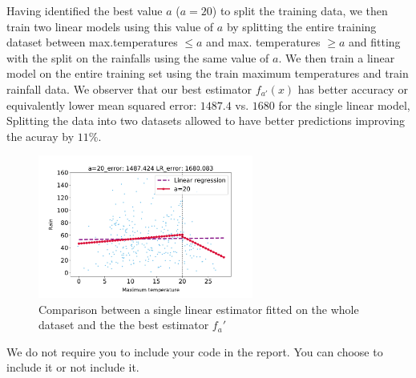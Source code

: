 \documentclass[12pt,twoside]{article}
\begin{document}
\begin{enumerate}
\begin{enumerate}
 	Having identified the best value $a$ ($a=20$) to split the training data, we then train two linear models using this value of $a$ by splitting the entire training dataset between
	max.temperatures $\le a$ and max. temperatures $\ge a$ and fitting with the split on the rainfalls using the same value of $a$.
	We then train a linear model on the entire training set using the train maximum temperatures and train rainfall data.
	We observer that our best estimator $f_{a'}(x)$ has better accuracy or equivalently lower mean squared error: $1487.4$ vs. $1680$ for the single linear model,
	Splitting the data into two datasets allowed to have better predictions improving the acuray by $11$\%.
	
	
 
 	\begin{figure}[H]
		\centering
		\includegraphics[width=200pt]{figures/test_comparison.pdf}
		\caption{Comparison between a single linear estimator fitted on the whole dataset and the  the best estimator $f_a'$}
		\label{fig6}
	\end{figure}


 \end{enumerate}
 	
 We do not require you to include your code in the report. You can choose to include it or not include it. 
\end{enumerate}
\end{document}
